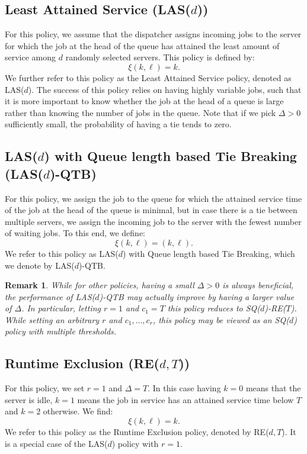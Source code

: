 \documentclass[12pt]{report}
\newtheorem{remark}{Remark}
\begin{document}
\subsection{Least Attained Service (LAS($d$))}
For this policy, we assume that the dispatcher assigns incoming jobs to the server for which the job at the head of the queue has attained the least amount of service among $d$ randomly
selected servers. This policy is defined by:
\begin{equation}\label{eq:xi_LAS}
\xi(k, \ell) = k.
\end{equation}
We further refer to this policy as the Least Attained Service policy, denoted as LAS($d$). The success of this policy relies on having highly variable jobs, such that it is more important to know whether the job at the head of a queue is large rather than knowing the number of jobs in the queue. Note that if we pick $\Delta > 0$ sufficiently small, the probability of having a tie tends to zero.

\subsection{LAS($d$) with Queue length based Tie Breaking (LAS($d$)-QTB)} \label{sec:LASQTB}
For this policy, we assign the job to the queue for which the attained service time of the job at the head of the queue is minimal, but in case there is a tie between multiple servers, we assign the incoming job to the server with the fewest number of waiting jobs. To this end, we define:
\begin{equation}\label{eq:LAS_QTB}
\xi(k,\ell)=(k, \ell).
\end{equation}
We refer to this policy as LAS($d$) with Queue length based Tie Breaking, which we denote by LAS($d$)-QTB.
\begin{remark}
While for other policies, having a small $\Delta > 0$ is always beneficial, the performance of LAS($d$)-QTB may actually improve by having a larger value of $\Delta$. In particular, letting $r=1$ and $c_1=T$ this policy reduces to SQ($d$)-RE($T$). While setting an arbitrary $r$ and $c_1,\dots,c_r$, this policy may be viewed as an SQ($d$) policy with multiple thresholds.
\end{remark}

\subsection{Runtime Exclusion (RE($d, T$))}
For this policy, we set $r=1$ and $\Delta=T$. In this case having $k=0$ means that the
server is idle, $k=1$ means the job in service has an attained service time below $T$ and
$k=2$ otherwise. 
 We find:
\begin{equation}\label{eq:xi_RE}
\xi(k,\ell)=k.
\end{equation}
We refer to this policy as the Runtime Exclusion policy, denoted by RE($d, T$).
It is a special case of the LAS($d$) policy with $r=1$.
\end{document}
